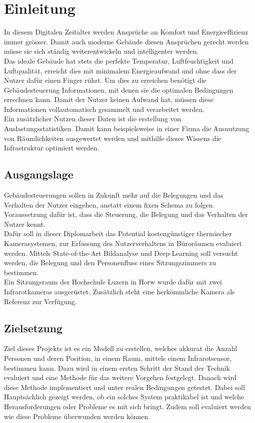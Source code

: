 \chapter{Einleitung}

In diesem Digitalen Zeitalter werden Ansprüche an Komfort und Energieeffizienz immer grösser. Damit auch moderne Gebäude diesen Ansprüchen gerecht werden müsse sie sich ständig weiterentwickeln und intelligenter werden.\\
Das ideale Gebäude hat stets die perfekte Temperatur, Luftfeuchtigkeit und Luftqualität, erreicht dies mit minimalem Energieaufwand und ohne dass der Nutzer dafür einen Finger rührt. Um dies zu erreichen benötigt die Gebäudesteuerung Informationen, mit denen sie die optimalen Bedingungen errechnen kann. Damit der Nutzer keinen Aufwand hat, müssen diese Informationen vollautomatisch gesammelt und verarbeitet werden.\\
Ein zusätzlicher Nutzen dieser Daten ist die erstellung von Auslastungsstatistiken. Damit kann beispielsweise in einer Firma die Ausnutzung von Räumlichkeiten ausgewertet werden und mithilfe dieses Wissens die Infrastruktur optimiert werden.

\section{Ausgangslage}
\label{sec:Ausgangslage}

Gebäudesteuerungen sollen in Zukunft mehr auf die Belegungen und das Verhalten der Nutzer eingehen, anstatt einem fixen Schema zu folgen. Voraussetzung dafür ist, dass die Steuerung, die Belegung und das Verhalten der Nutzer kennt.\\
Dafür soll in dieser Diplomarbeit das Potential kostengünstiger thermischer Kamerasystemen, zur Erfassung des Nutzerverhaltens in Büroräumen evaluiert werden. Mittels State-of-the-Art Bildanalyse und Deep-Learning soll versucht werden, die Belegung und den Personenfluss eines Sitzungszimmers zu bestimmen.\\
Ein Sitzungsraum der Hochschule Luzern in Horw wurde dafür mit zwei Infrarotkameras ausgerüstet. Zusätzlich steht eine herkömmliche Kamera als Referenz zur Verfügung.


\section{Zielsetzung}
\label{sec:Zielsetzung}

Ziel dieses Projekts ist es ein Modell zu erstellen, welches akkurat die Anzahl Personen und deren Position, in einem Raum, mittels einem Infrarotsensor, bestimmen kann. Dazu wird in einem ersten Schritt der Stand der Technik evaluiert und eine Methode für das weitere Vorgehen festgelegt. Danach wird diese Methode implementiert und unter realen Bedingungen getestet. Dabei soll Hauptsächlich gezeigt werden, ob ein solches System praktikabel ist und welche Herausforderungen oder Probleme es mit sich bringt. Zudem soll evaluiert werden wie diese Probleme überwunden werden können.

